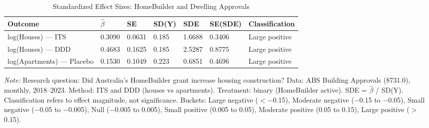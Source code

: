 \begin{table}[!h]
\centering
\caption{\label{tab:sde}Standardized Effect Sizes: HomeBuilder and Dwelling Approvals}
\footnotesize
\begin{tabular}[t]{lllllll}
\toprule
Outcome & $\hat{\beta}$ & SE & SD(Y) & SDE & SE(SDE) & Classification\\
\midrule
log(Houses) --- ITS & 0.3090 & 0.0631 & 0.185 & 1.6688 & 0.3406 & Large positive\\
log(Houses) --- DDD & 0.4683 & 0.1625 & 0.185 & 2.5287 & 0.8775 & Large positive\\
log(Apartments) --- Placebo & 0.1530 & 0.1049 & 0.223 & 0.6851 & 0.4696 & Large positive\\
\bottomrule
\end{tabular}

\vspace{0.3em}
{\scriptsize \textit{Note:} Research question: Did Australia's HomeBuilder grant increase housing construction? Data: ABS Building Approvals (8731.0), monthly, 2018--2023. Method: ITS and DDD (houses vs apartments). Treatment: binary (HomeBuilder active). SDE = $\hat{\beta}$ / SD(Y). Classification refers to effect magnitude, not significance. Buckets: Large negative ($<$$-$0.15), Moderate negative ($-$0.15 to $-$0.05), Small negative ($-$0.05 to $-$0.005), Null ($-$0.005 to 0.005), Small positive (0.005 to 0.05), Moderate positive (0.05 to 0.15), Large positive ($>$0.15).}
\end{table}
